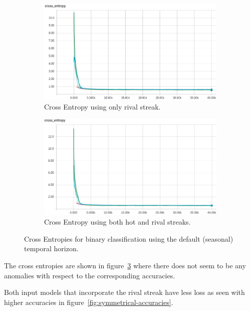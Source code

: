 \documentclass{article} %
\begin{document}
\begin{figure}[!htb]
  \begin{subfigure}{0.5\textwidth}
    \includegraphics[width=\linewidth]{plots/model1/symmetrical/streak-r/crossentropy.png}
    \caption{Cross Entropy using only rival streak.}\label{fig:symmetrical-r-crossentropy}
  \end{subfigure}
  \begin{subfigure}{0.5\textwidth}
    \includegraphics[width=\linewidth]{plots/model1/symmetrical/streak-hr/crossentropy.png}
    \caption{Cross Entropy using both hot and rival streaks.}\label{fig:symmetrical-hr-crossentropy}
  \end{subfigure}

  \caption{Cross Entropies for binary classification using the default (seasonal) temporal horizon.}
  \label{fig:symmetrical-crossentropies}
\end{figure}

The cross entropies are shown in figure~\ref{fig:symmetrical-crossentropies} where there does not seem to be any anomalies with respect to the corresponding accuracies.

Both input models that incorporate the rival streak have less loss as seen with higher accuracies in figure~\ref{fig:symmetrical-accuracies}.
\end{document}
